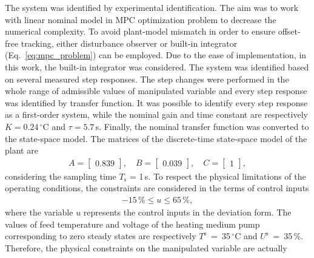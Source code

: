 \documentclass[preprint,12pt]{elsarticle}
\begin{document}
The system was identified by experimental identification. The aim was to work with linear nominal model in MPC optimization problem to decrease the numerical complexity. To avoid plant-model mismatch in order to ensure offset-free tracking, either disturbance observer or built-in integrator (Eq.~\eqref{eq:mpc_problem}) can be employed. Due to the ease of implementation, in this work, the built-in integrator was considered. The system was identified based on several measured step responses. The step changes were performed in the whole range of admissible values of manipulated variable and every step response was identified by transfer function. It was possible to identify every step response as a first-order system, while the nominal gain and time constant are respectively $K = 0.24\,^{\circ}\mathrm{C}$ and $\tau = 5.7$\,s. 
Finally, the nominal transfer function was converted to the state-space model. The matrices of the discrete-time state-space model of the plant are
\begin{subequations}
	\label{eq:model_A_B} 
	\begin{eqnarray}
		A = \begin{bmatrix}
			0.839
		\end{bmatrix}, \quad
		B = \begin{bmatrix}
			0.039
		\end{bmatrix}, \quad
		C = \begin{bmatrix}
			1
		\end{bmatrix}, 
	\end{eqnarray}
\end{subequations}
considering the sampling time $T_\mathrm{s}$ = 1\,s. 
To respect the physical limitations of the operating conditions, the constraints are considered in the terms of control inputs
\begin{eqnarray}
	\label{eq:u_const}
	-15\,\% \le u \le 65\,\%,
\end{eqnarray}
where the variable $u$ represents the control inputs in the deviation form. The values of feed temperature and voltage of the heating medium pump corresponding to zero steady states are respectively $T^\mathrm{s}$~=~35\,$^{\circ}\mathrm{C}$ and $U^\mathrm{s}$~=~35\,\%. Therefore, the physical constraints on the manipulated variable are actually
\end{document}
